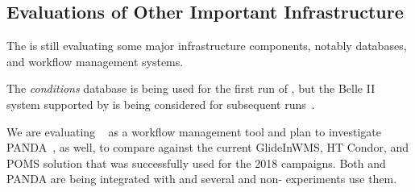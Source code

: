\subsection{Evaluations of Other Important Infrastructure}

The   is still evaluating some major infrastructure components, notably databases, and workflow management systems.

The  \textit{conditions} database is being used for the first run of , but the Belle II~\cite{Ritter:2018jxh} system supported by  is being considered for subsequent runs~\cite{Laycock:2019ynk}. 

We are evaluating ~\cite{Falabella:2016waj} as a workflow management tool and plan to investigate PANDA~\cite{Megino:2017ywl}, as well, to compare against the current GlideInWMS, HT Condor, and POMS solution that was successfully used for the 2018  campaigns.
Both  and PANDA are being integrated with  and several  and non- experiments use them.
